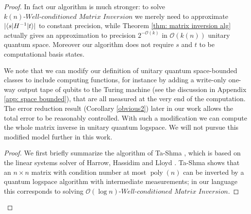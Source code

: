 \documentclass[11pt]{article}
\theoremstyle{definition}
\theoremstyle{remark}
\newcommand\matrixinvert[1]{{\ensuremath{#1}}\textit{-Well-conditioned Matrix Inversion}}
\newcommand\bigoh{\mathcal{O}}
\DeclareMathOperator{\poly}{poly}
\begin{document}
\begin{proof}
In fact our algorithm is much stronger: to solve $\matrixinvert{k(n)}$ we merely need to approximate $|{\left\langle{s}\right\vert}H^{-1}{\left\vert{t}\right\rangle}|$ to constant precision, while Theorem \ref{thm: matrix inversion alg} actually gives an approximation to precision $2^{-\bigoh (k)}$ in $\bigoh (k(n))$ unitary quantum space. Moreover our algorithm does not require $s$ and $t$ to be computational basis states.

We note that we can modify our definition of unitary quantum space-bounded classes to include computing functions, for instance by adding a write-only one-way output tape of qubits to the Turing machine (see the discussion in Appendix \ref{app: space bounded}), that are all measured at the very end of the computation. The error reduction result (Corollary \ref{obvious2}) later in our work allows the total error to be reasonably controlled. With such a modification we can compute the whole matrix inverse in unitary quantum logspace. We will not pursue this modified model further in this work.

\begin{proof}
We first briefly summarize the algorithm of Ta-Shma \cite{tashma}, which  is based on the linear systems solver of Harrow, Hassidim and Lloyd \cite{HHL}.  Ta-Shma shows that an $n \times n$ matrix with condition number at most $\poly(n)$ can be inverted by a quantum logspace algorithm with intermediate measurements; in our language this corresponds to solving $\matrixinvert{\bigoh(\log{n})}$. %


\end{proof}
\end{proof}
\end{document}

